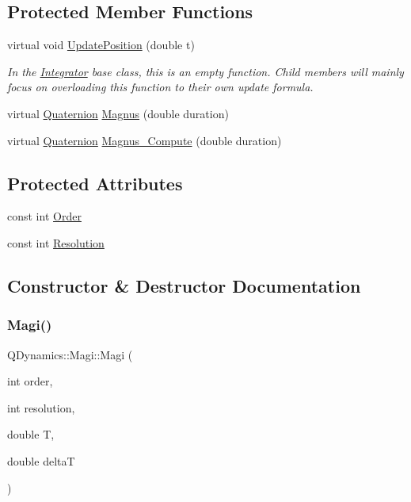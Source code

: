 \subsection*{Protected Member Functions}
\begin{DoxyCompactItemize}
\item 
virtual void \hyperlink{classQDynamics_1_1Magi_a500467f899244edfae15f34c84c7684c}{Update\+Position} (double t)
\begin{DoxyCompactList}\small\item\em In the \hyperlink{classQDynamics_1_1Integrator}{Integrator} base class, this is an empty function. Child members will mainly focus on overloading this function to their own update formula. \end{DoxyCompactList}\item 
virtual \hyperlink{classQDynamics_1_1Quaternion}{Quaternion} \hyperlink{classQDynamics_1_1Magi_a04b85c8aa0e9549c750956c5f781433b}{Magnus} (double duration)
\item 
virtual \hyperlink{classQDynamics_1_1Quaternion}{Quaternion} \hyperlink{classQDynamics_1_1Magi_aadacdb3581a42babd5e1aa9ada6c77ee}{Magnus\+\_\+\+Compute} (double duration)
\end{DoxyCompactItemize}
\subsection*{Protected Attributes}
\begin{DoxyCompactItemize}
\item 
const int \hyperlink{classQDynamics_1_1Magi_ac9ff1c2f4ea0dcc30f1ee52b0894c9e9}{Order}
\item 
const int \hyperlink{classQDynamics_1_1Magi_a629449f541590040a7dfb98ca68cf97b}{Resolution}
\end{DoxyCompactItemize}


\subsection{Constructor \& Destructor Documentation}
\mbox{\label{classQDynamics_1_1Magi_a5b95b7c32c314e2800f59366964abfc3}} 
\subsubsection{\texorpdfstring{Magi()}{Magi()}\hspace{0.1cm}{\footnotesize\ttfamily [1/2]}}
{\footnotesize\ttfamily Q\+Dynamics\+::\+Magi\+::\+Magi (\begin{DoxyParamCaption}\item[{int}]{order,  }\item[{int}]{resolution,  }\item[{double}]{T,  }\item[{double}]{deltaT }\end{DoxyParamCaption})\hspace{0.3cm}{\ttfamily [inline]}}

